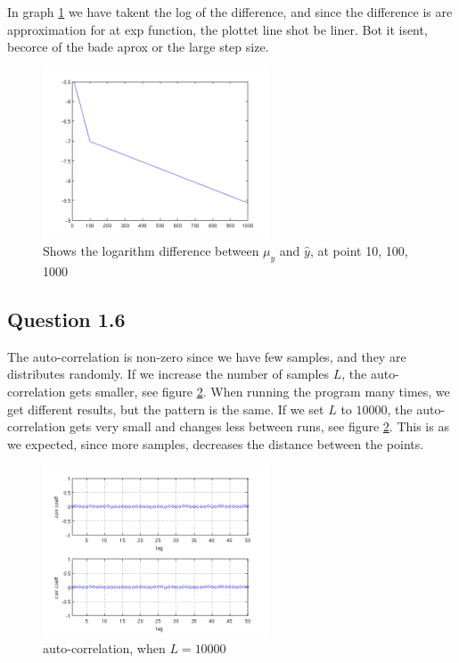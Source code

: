 \documentclass[a4paper, 10pt, final]{article}
\begin{document}
In graph \ref{fig:q5_log} we have takent the log of the difference, and
since the difference is are approximation for at exp function, the
plottet line shot be liner. Bot it isent, becorce of the bade aprox or
the large step size.

\begin{figure}[!ht]
  \centering
  \includegraphics[width=0.6\textwidth]{images/q5_L10_L100_L1000_log}
  \caption{Shows the logarithm difference between $\mu _y$ and $\hat{y}$, at point 10, 100, 1000}
  \label{fig:q5_log}
\end{figure}

\subsection*{Question 1.6}

The auto-correlation is non-zero since we have few samples, and they
are distributes randomly. If we increase the number of samples $L$, the
auto-correlation gets smaller, see figure \ref{L10000}. When running the
program many times, we get different results, but the pattern is the same.
If we set $L$ to $10000$, the auto-correlation gets very small and changes
less between runs, see figure \ref{L10000}. This is as we expected, since
more samples, decreases the distance between the points.

\begin{figure}[!htpb]
  \centering
  \includegraphics[width=0.6\textwidth]{images/L10000}
  \caption{auto-correlation, when $L = 10000$}
  \label{L10000}
\end{figure}
\newpage
\newpage
\newpage
\newpage
\newpage
\end{document}
